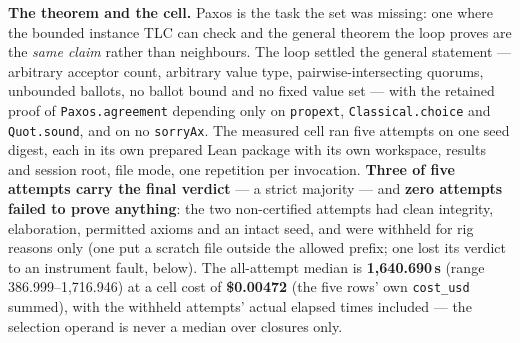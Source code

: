 \documentclass[11pt,a4paper]{article}
\begin{document}
\textbf{The theorem and the cell.} Paxos is the task the set was missing: one where the bounded instance
TLC can check and the general theorem the loop proves are the \emph{same claim} rather than neighbours.
The loop settled the general statement --- arbitrary acceptor count, arbitrary value type,
pairwise-intersecting quorums, unbounded ballots, no ballot bound and no fixed value set --- with the
retained proof of \texttt{Paxos.agreement} depending only on \texttt{propext},
\texttt{Classical.choice} and \texttt{Quot.sound}, and on no \texttt{sorryAx}. The measured cell ran five
attempts on one seed digest, each in its own prepared Lean package with its own workspace, results and
session root, file mode, one repetition per invocation. \textbf{Three of five attempts carry the final
verdict} --- a strict majority --- and \textbf{zero attempts failed to prove anything}: the two
non-certified attempts had clean integrity, elaboration, permitted axioms and an intact seed, and were
withheld for rig reasons only (one put a scratch file outside the allowed prefix; one lost its verdict to
an instrument fault, below). The all-attempt median is \textbf{1{,}640.690\,s} (range 386.999--1{,}716.946)
at a cell cost of \textbf{\$0.00472} (the five rows' own \texttt{cost\_usd} summed), with the withheld
attempts' actual elapsed times included --- the selection operand is never a median over closures only.
\end{document}
